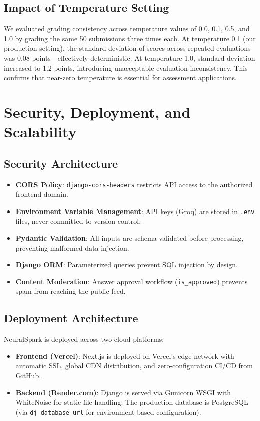\documentclass[conference]{IEEEtran}
\begin{document}
\subsection{Impact of Temperature Setting}
We evaluated grading consistency across temperature values of 0.0, 0.1, 0.5, and 1.0 by grading the same 50 submissions three times each. At temperature 0.1 (our production setting), the standard deviation of scores across repeated evaluations was 0.08 points---effectively deterministic. At temperature 1.0, standard deviation increased to 1.2 points, introducing unacceptable evaluation inconsistency. This confirms that near-zero temperature is essential for assessment applications.

\section{Security, Deployment, and Scalability}

\subsection{Security Architecture}
\begin{itemize}[leftmargin=*]
    \item \textbf{CORS Policy}: \texttt{django-cors-headers} restricts API access to the authorized frontend domain.
    \item \textbf{Environment Variable Management}: API keys (Groq) are stored in \texttt{.env} files, never committed to version control.
    \item \textbf{Pydantic Validation}: All inputs are schema-validated before processing, preventing malformed data injection.
    \item \textbf{Django ORM}: Parameterized queries prevent SQL injection by design.
    \item \textbf{Content Moderation}: Answer approval workflow (\texttt{is\_approved}) prevents spam from reaching the public feed.
\end{itemize}

\subsection{Deployment Architecture}
NeuralSpark is deployed across two cloud platforms:
\begin{itemize}[leftmargin=*]
    \item \textbf{Frontend (Vercel)}: Next.js is deployed on Vercel's edge network with automatic SSL, global CDN distribution, and zero-configuration CI/CD from GitHub.
    \item \textbf{Backend (Render.com)}: Django is served via Gunicorn WSGI with WhiteNoise for static file handling. The production database is PostgreSQL (via \texttt{dj-database-url} for environment-based configuration).
\end{itemize}
\end{document}
